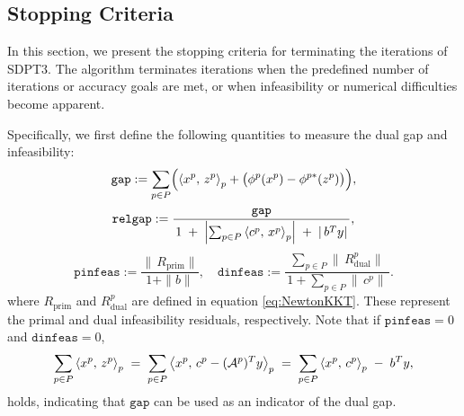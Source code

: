 \subsection{Stopping Criteria}
\label{sec:stopping_criteria}
In this section, we present the stopping criteria for terminating the iterations of SDPT3.
The algorithm terminates iterations when the predefined number of iterations or accuracy goals are met, or when infeasibility or numerical difficulties become apparent.

Specifically, we first define the following quantities to measure the dual gap and infeasibility:
\[
  \mathtt{gap}
  := \sum_{p\in P}
       \Bigl(\left\langle x^p, \, z^p \right\rangle_p + \bigl(\phi^p(x^p) - \phi^{p*}(z^p)\bigr)\Bigr),
\]
\[
  \mathtt{relgap}
  := \frac{\mathtt{gap}}
           {\,1 \;+\;\Bigl|\sum_{p\in P}\left\langle c^p, \, x^p \right\rangle_p\Bigr|
                 \;+\;|\,b^T y|\,},
\]
\[
  \mathtt{pinfeas}
  := \frac{\|\,R_{\text{prim}}\|}{\,1 + \|b\|\,},
  \quad
  \mathtt{dinfeas}
  := \frac{\sum_{p\in P}\|\,R^p_{\text{dual}}\|}
           {\,1 + \sum_{p\in P}\|\,c^p\|\,}.
\]
where $R_{\text{prim}}$ and $R_{\text{dual}}^p$ are defined in equation \eqref{eq:NewtonKKT}.
These represent the primal and dual infeasibility residuals, respectively.
Note that if $\mathtt{pinfeas} = 0$ and $\mathtt{dinfeas} = 0$,
\[
  \sum_{p\in P}\left\langle x^p, \, z^p \right\rangle_p 
  \;=\;
  \sum_{p\in P}\left\langle x^p, \, c^p - (\mathcal{A}^p)^T y \right\rangle_p
  \;=\; \sum_{p\in P}\left\langle x^p, \, c^p \right\rangle_p \;-\; b^T y,
\]
holds, indicating that $\mathtt{gap}$ can be used as an indicator of the dual gap.

